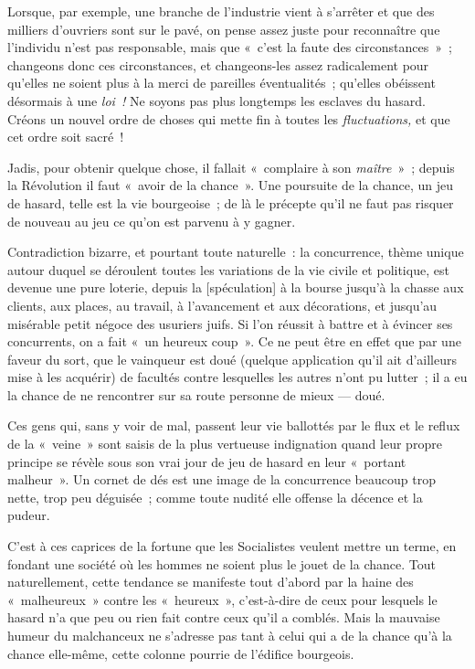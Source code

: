 \documentclass[french,twoside]{book} %
\newcommand\corr[1]{#1}
\begin{document}
Lorsque, par exemple, une branche de l’industrie vient à s’arrêter et que des milliers d’ouvriers sont sur le pavé, on pense assez juste pour reconnaître que l’individu n’est pas responsable, mais que « c’est la faute des circonstances » ; changeons donc ces circonstances, et changeons-les assez radicalement pour qu’elles ne soient plus à la merci de pareilles éventualités ; qu’elles obéissent désormais à une \emph{loi !} Ne soyons pas plus longtemps les esclaves du hasard. Créons un nouvel ordre de choses qui mette fin à toutes les \emph{fluctuations,} et que cet ordre soit sacré !\par
Jadis, pour obtenir quelque chose, il fallait « complaire à son \emph{maître} » ; depuis la Révolution il faut « avoir de la chance ». Une poursuite de la chance, un jeu de hasard, telle est la vie bourgeoise ; de là le précepte qu’il ne faut pas risquer de nouveau au jeu ce qu’on est parvenu à y gagner.\par
Contradiction bizarre, et pourtant toute naturelle : la concurrence, thème unique autour duquel se déroulent toutes les variations de la vie civile et politique, est devenue une pure loterie, depuis la [{\corr spéculation}] à la bourse jusqu’à la chasse aux clients, aux places, au travail, à l’avancement et aux décorations, et jusqu’au misérable petit négoce des usuriers juifs. Si l’on réussit à battre et à évincer ses concurrents, on a fait « un heureux coup ». Ce ne peut être en effet que par une faveur du sort, que le vainqueur est doué (quelque application qu’il ait d’ailleurs mise à les acquérir) de facultés contre lesquelles les autres n’ont  pu lutter ; il a eu la chance de ne rencontrer sur sa route personne de mieux — doué.\par
Ces gens qui, sans y voir de mal, passent leur vie ballottés par le flux et le reflux de la « veine » sont saisis de la plus vertueuse indignation quand leur propre principe se révèle sous son vrai jour de jeu de hasard en leur « portant malheur ». Un cornet de dés est une image de la concurrence beaucoup trop nette, trop peu déguisée ; comme toute nudité elle offense la décence et la pudeur.\par
C’est à ces caprices de la fortune que les Socialistes veulent mettre un terme, en fondant une société où les hommes ne soient plus le jouet de la chance. Tout naturellement, cette tendance se manifeste tout d’abord par la haine des « malheureux » contre les « heureux », c’est-à-dire de ceux pour lesquels le hasard n’a que peu ou rien fait contre ceux qu’il a comblés. Mais la mauvaise humeur du malchanceux ne s’adresse pas tant à celui qui a de la chance qu’à la chance elle-même, cette colonne pourrie de l’édifice bourgeois.\par
\end{document}
